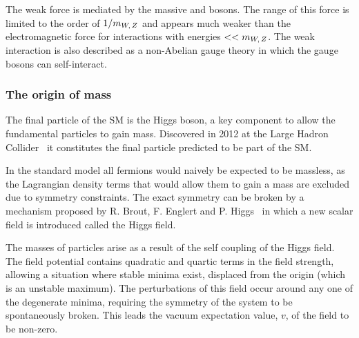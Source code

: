 The weak force is mediated by the massive \Wpm and \Z bosons. The range of this force is limited to the order of $1/m_{{W},\,{Z}}$ and appears much weaker than the electromagnetic force for interactions with energies $<< m_{{W},\,{Z}}$. The weak interaction is also described as a non-Abelian gauge theory in which the gauge bosons can self-interact. 



\subsubsection{The origin of mass}
The final particle of the SM is the Higgs boson, a key component to allow the fundamental particles to gain mass. Discovered in 2012 at the Large Hadron Collider~\cite{Aad:2012tfa,Chatrchyan:2012xdj} it constitutes the final particle predicted to be part of the SM. 

In the standard model all fermions would naively be expected to be massless, as the Lagrangian density terms that would allow them to gain a mass are excluded due to symmetry constraints. The exact symmetry can be broken by a mechanism proposed by R. Brout, F. Englert and P. Higgs~\cite{PhysRevLett.13.508,PhysRevLett.13.321} in which a new scalar field is introduced called the Higgs field. 

The masses of particles arise as a result of the self coupling of the Higgs field. The field potential contains quadratic and quartic terms in the field strength, allowing a situation where stable minima exist, displaced from the origin (which is an unstable maximum). The perturbations of this field occur around any one of the degenerate minima, requiring the symmetry of the system to be spontaneously broken. This leads the vacuum expectation value, $v$, of the field to be non-zero.   



